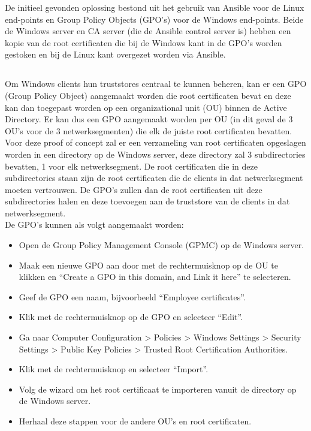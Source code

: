 De initieel gevonden oplossing bestond uit het gebruik van Ansible voor de Linux end-points en Group Policy Objects (GPO's) voor de Windows end-points. Beide de Windows server en CA server (die de Ansible control server is) hebben een kopie van de root certificaten die bij de Windows kant in de GPO's worden gestoken en bij de Linux kant overgezet worden via Ansible.

\subsection{}
\label{subsec:Oplossing_door_middel_van_GPOs_met_root_certificaten}
Om Windows clients hun truststores centraal te kunnen beheren, kan er een GPO (Group Policy Object) aangemaakt worden die root certificaten bevat en deze kan dan toegepast worden op een organizational unit (OU) binnen de Active Directory.
Er kan dus een GPO aangemaakt worden per OU (in dit geval de 3 OU's voor de 3 netwerksegmenten) die elk de juiste root certificaten bevatten. \\

Voor deze proof of concept zal er een verzameling van root certificaten opgeslagen worden in een directory op de Windows server, deze directory zal 3 subdirectories bevatten, 1 voor elk netwerksegment. De root certificaten die in deze subdirectories staan zijn de root certificaten die de clients in dat netwerksegment moeten vertrouwen.
De GPO's zullen dan de root certificaten uit deze subdirectories halen en deze toevoegen aan de truststore van de clients in dat netwerksegment. \\

De GPO's kunnen als volgt aangemaakt worden:
\begin{itemize}
    \item Open de Group Policy Management Console (GPMC) op de Windows server.
    \item Maak een nieuwe GPO aan door met de rechtermuisknop op de OU te klikken en ``Create a GPO in this domain, and Link it here'' te selecteren.
    \item Geef de GPO een naam, bijvoorbeeld ``Employee certificates''.
    \item Klik met de rechtermuisknop op de GPO en selecteer ``Edit''.
    \item Ga naar Computer Configuration > Policies > Windows Settings > Security Settings > Public Key Policies > Trusted Root Certification Authorities.
    \item Klik met de rechtermuisknop en selecteer ``Import''.
    \item Volg de wizard om het root certificaat te importeren vanuit de directory op de Windows server.
    \item Herhaal deze stappen voor de andere OU's en root certificaten.
\end{itemize}

